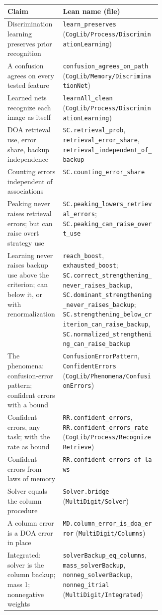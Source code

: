 \documentclass[11pt]{article}
\newcommand{\code}[1]{\texttt{#1}}
\newcommand{\lean}[1]{\texttt{#1}}
\begin{document}
\begin{table}[h]
\centering
\small
\footnotesize
\begin{tabularx}{\linewidth}{@{}>{\raggedright\arraybackslash}p{0.36\linewidth}>{\raggedright\arraybackslash}X@{}}
\toprule
Claim & Lean name (file) \\
\midrule
Discrimination learning preserves prior recognition & \lean{learn\_preserves} (\code{CogLib/Process/DiscriminationLearning}) \\
A confusion agrees on every tested feature & \lean{confusion\_agrees\_on\_path} (\code{CogLib/Memory/DiscriminationNet}) \\
Learned nets recognize each image as itself & \lean{learnAll\_clean} (\code{CogLib/Process/DiscriminationLearning}) \\
DOA retrieval use, error share, backup independence & \lean{SC.retrieval\_prob}, \lean{retrieval\_error\_share}, \lean{retrieval\_independent\_of\_backup} \\
Counting errors independent of associations & \lean{SC.counting\_error\_share} \\
Peaking never raises retrieval errors; but can raise overt strategy use & \lean{SC.peaking\_lowers\_retrieval\_errors}; \lean{SC.peaking\_can\_raise\_overt\_use} \\
Learning never raises backup use above the criterion; can below it, or with renormalization & \lean{reach\_boost}, \lean{exhausted\_boost}; \lean{SC.correct\_strengthening\_never\_raises\_backup}, \lean{SC.dominant\_strengthening\_never\_raises\_backup}; \lean{SC.strengthening\_below\_criterion\_can\_raise\_backup}, \lean{SC.normalized\_strengthening\_can\_raise\_backup} \\
The phenomena: confusion-error pattern; confident errors with a bound & \lean{ConfusionErrorPattern}, \lean{ConfidentErrors} (\code{CogLib/Phenomena/ConfusionErrors}) \\
Confident errors, any task; with the rate as bound & \lean{RR.confident\_errors}, \lean{RR.confident\_errors\_rate} (\code{CogLib/Process/RecognizeRetrieve}) \\
Confident errors from laws of memory & \lean{RR.confident\_errors\_of\_laws} \\
Solver equals the column procedure & \lean{Solver.bridge} (\code{MultiDigit/Solver}) \\
A column error is a DOA error in place & \lean{MD.column\_error\_is\_doa\_error} (\code{MultiDigit/Columns}) \\
Integrated: solver is the column backup; mass 1; nonnegative weights & \lean{solverBackup\_eq\_columns}, \lean{mass\_solverBackup}, \lean{nonneg\_solverBackup}, \lean{nonneg\_itrial} (\code{MultiDigit/Integrated}) \\

\end{tabularx}
\end{table}
\end{document}
